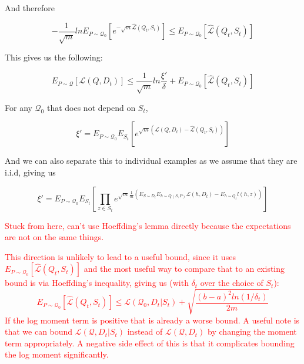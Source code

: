 \documentclass[letterpaper]{article}
\theoremstyle{definition}
\begin{document}
And therefore 

$$-\frac{1}{\sqrt{m}}ln E_{P\sim \mathcal{Q}_0} \left [e^{-\sqrt{m}\hat{\mathcal{L}}(Q_t, S_t)}\right ] \leq E_{P\sim \mathcal{Q}_0} \left [\hat{\mathcal{L}}(Q_t, S_t)\right ]$$

This gives us the following:

$$ E_{P\sim \mathcal{Q}} \left [\mathcal{L}(Q, D_t)\right ] \leq  \frac{1}{\sqrt{m}}ln\frac{\xi'}{\delta} + E_{P\sim \mathcal{Q}_0} \left [\hat{\mathcal{L}}(Q_t, S_t)\right ] $$

For any $\mathcal{Q}_0$ that does not depend on $S_t$, 

$$\xi' = E_{P\sim \mathcal{Q}_0} E_{S_t} \left [ e^{\sqrt{m}\left (\mathcal{L}(Q, D_t) - \hat{\mathcal{L}}(Q_t, S_t)\right )}\right ]$$

And we can also separate this to individual examples as we assume that they are i.i.d, giving us 

$$\xi' = E_{P\sim \mathcal{Q}_0} E_{S_t} \left [ \prod_{z\in S_t} e^{\sqrt{m}\frac{1}{m}\left ( E_{S\sim D_t}E_{h\sim Q(S,P)}\mathcal{L}(h, D_t) - E_{h\sim Q_t}l(h, z)\right )}\right ]$$

\textcolor{red}{Stuck from here, can't use Hoeffding's lemma directly because the expectations are not on the same things.}

\textcolor{red}{This direction is unlikely to lead to a useful bound, since it uses $E_{P\sim \mathcal{Q}_0} \left [\hat{\mathcal{L}}(Q_t, S_t)\right ]$ and the most useful way to compare that to an existing bound is via Hoeffding's inequality, giving us (with $\delta_t$ over the choice of $S_t$):
	$$E_{P\sim \mathcal{Q}_0} \left [\hat{\mathcal{L}}(Q_t, S_t)\right ] \leq \mathcal{L}(\mathcal{Q}_0, D_t|S_t) + \sqrt{\frac{(b-a)^2 ln(1/\delta_t)}{2m}} $$
If the log moment term is positive that is already a worse bound.
A useful note is that we can bound $\mathcal{L}(\mathcal{Q}, D_t|S_t)$ instead of $\mathcal{L}(\mathcal{Q}, D_t)$ by changing the moment term appropriately. A negative side effect of this is that it complicates bounding the log moment significantly. }





\end{document}
